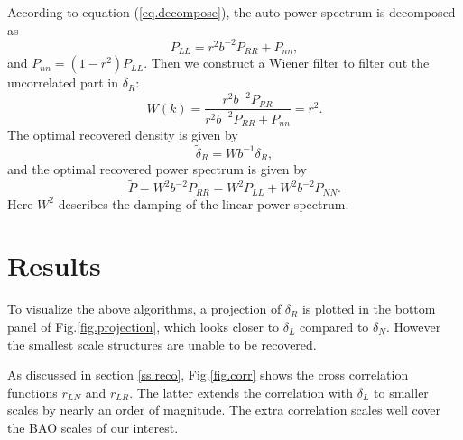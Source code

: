 \documentclass[aps,prd,twocolumn,superscriptaddress,amsfont,amssymb,amsmath,nofootinbib,showpacs,balancelastpage]{revtex4-1}
\begin{document}
According to equation (\ref{eq.decompose}), the auto power spectrum is decomposed as
\begin{equation}\label{eq.power}
    P_{LL}=r^2b^{-2}P_{RR}+P_{nn},
\end{equation}
and $P_{nn}=(1-r^2)P_{LL}$. Then we construct a Wiener filter to filter out the uncorrelated part in $\delta_R$:
\begin{equation}
    W(k)=\frac{r^2b^{-2}P_{RR}}{r^2b^{-2}P_{RR}+P_{nn}}=r^2.
\end{equation}
The optimal recovered density is given by
\begin{equation}
    \tilde\delta_R=Wb^{-1}\delta_R,
\end{equation}
and the optimal recovered power spectrum is given by
\begin{equation}\label{eq.opt}
    \tilde P=W^2b^{-2}P_{RR}=W^2P_{LL}+W^2b^{-2}P_{NN}.
\end{equation}
Here $W^2$ describes the damping of the linear power spectrum.

\section{Results}\label{sec.results}

To visualize the above algorithms, a projection of $\delta_R$ is plotted in
the bottom panel of Fig.\ref{fig.projection}, which looks closer to 
$\delta_L$ compared to $\delta_N$. However the smallest scale structures are unable
to be recovered.

As discussed in section \ref{ss.reco},
Fig.\ref{fig.corr} shows the cross correlation functions
$r_{LN}$ and $r_{LR}$. The latter extends the correlation
with $\delta_L$ to smaller scales by nearly an order of
magnitude. The extra correlation scales well cover the BAO
scales of our interest.
\end{document}
